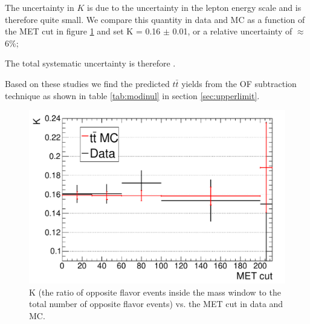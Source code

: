 The uncertainty in $K$ is due to the uncertainty in the lepton energy scale and is therefore quite small.
We compare this quantity in data and \ttbar MC as a function of the MET cut
in figure \ref{fig:kmc}
and set K = 0.16 $\pm$ 0.01, or a relative uncertainty of $\approx$6\%;

The total systematic uncertainty is therefore \ofsystpercentage.

Based on these studies we find the predicted $t\bar{t}$ yields from the OF subtraction technique 
as shown in table \ref{tab:modinul} in section \ref{sec:upperlimit}.



\begin{figure}[tbh]
  \begin{center}
	\includegraphics[width=0.48\linewidth]{plots/kvmet_data_ttbm.pdf}
	\caption{
	  \label{fig:kmc}\protect 
	  K (the ratio of opposite flavor events inside the \Z mass window
	  to the total number of opposite flavor events)
	  vs. the MET cut in data and \ttbar MC.
	}
  \end{center}
\end{figure}

